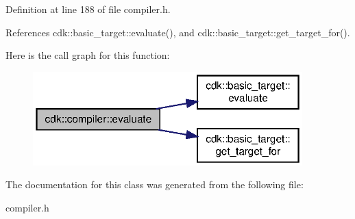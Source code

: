 Definition at line 188 of file compiler.\+h.



References cdk\+::basic\+\_\+target\+::evaluate(), and cdk\+::basic\+\_\+target\+::get\+\_\+target\+\_\+for().

Here is the call graph for this function\+:
\nopagebreak
\begin{figure}[H]
\begin{center}
\leavevmode
\includegraphics[width=295pt]{classcdk_1_1compiler_a0c0d48f8b1101bb17bd1908785d62eff_cgraph}
\end{center}
\end{figure}


The documentation for this class was generated from the following file\+:\begin{DoxyCompactItemize}
\item 
compiler.\+h\end{DoxyCompactItemize}
